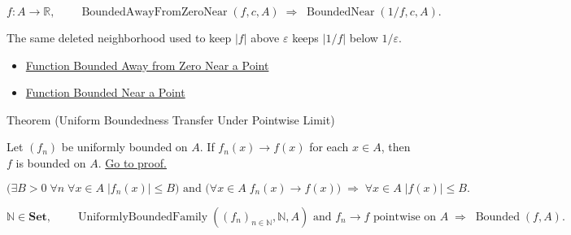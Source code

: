 \begin{remark*}
\[
  f\colon A\to\mathbb{R},\qquad\operatorname{BoundedAwayFromZeroNear}(f,c,A)
  \;\Longrightarrow\;
  \operatorname{BoundedNear}(1/f,c,A).
\]
\end{remark*}

\begin{remark*}[Interpretation]
The same deleted neighborhood used to keep \(|f|\) above \(\varepsilon\) keeps
\(|1/f|\) below \(1/\varepsilon\).
\end{remark*}

\begin{dependencies}
\begin{itemize}
  \item \hyperref[def:function-bounded-away-from-zero-near]{Function Bounded Away from Zero Near a Point}
  \item \hyperref[def:function-bounded-near-point]{Function Bounded Near a Point}
\end{itemize}
\end{dependencies}

\begin{theorembox}{Theorem (Uniform Boundedness Transfer Under Pointwise Limit)}
\begin{theorem}
\label{thm:uniform-boundedness-transfer-under-pointwise-limit}
Let \((f_n)\) be uniformly bounded on \(A\).  If \(f_n(x)\to f(x)\) for each
\(x\in A\), then \(f\) is bounded on \(A\).
\hyperref[prf:uniform-boundedness-transfer-under-pointwise-limit]{Go to proof.}
\end{theorem}
\end{theorembox}

\begin{remark*}
\[
  \bigl(\exists B>0\;\forall n\;\forall x\in A\;|f_n(x)|\leq B\bigr)
  \text{ and }
  \bigl(\forall x\in A\;f_n(x)\to f(x)\bigr)
  \;\Longrightarrow\;
  \forall x\in A\;|f(x)|\leq B.
\]
\end{remark*}

\begin{remark*}
\[
  \mathbb{N}\in\mathbf{Set},\qquad\operatorname{UniformlyBoundedFamily}((f_n)_{n\in\mathbb{N}},\mathbb{N},A)
  \text{ and } f_n\to f\text{ pointwise on }A
  \;\Longrightarrow\;
  \operatorname{Bounded}(f,A).
\]
\end{remark*}

